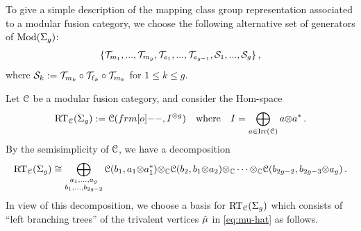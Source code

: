 \documentclass[11pt]{article}
\begin{document}
To give a simple description of the mapping class group representation associated to a modular fusion category, we choose the following alternative set of generators of $\operatorname{Mod}(\Sigma_{g})$:
\begin{equation}\label{eq:mcg-gen}
\{\dt_{m_{1}}, ..., \dt_{m_{g}}, \dt_{e_{1}}, ..., \dt_{e_{g-1}}, \cmcs_{1}, ..., \cmcs_{g}\}\,,
\end{equation}
where $\cmcs_{k} := \dt_{m_{k}} \circ \dt_{\ell_{k}}\circ \dt_{m_{k}}$ for $1 \le k \le g$.

Let $\mathcal{C}$ be a modular fusion category, and consider the Hom-space
\begin{equation}\label{eq:RT-space}
\RTspace{\cC}{g} := \CC(\1, I^{\ot g}) \quad\text{where}\quad
I = \bigoplus_{a \in \irr(\CC)} a \ot a^*\,.
\end{equation}
By the semisimplicity of $\mathcal{C}$, we have a decomposition
\begin{equation}\label{eq:W-decomp}
\operatorname{RT}_{\mathcal{C}}(\Sigma_{g}) \cong 
\bigoplus_{\substack{a_1, ..., a_g\\b_1, ..., b_{2g-2}}}
{\mathcal{C}}(b_1, a_1 {\otimes} a_1^*) {\otimes}_{{\mathbb{C}}} \mathcal{C}(b_2, b_1 {\otimes} a_2) {\otimes}_{{\mathbb{C}}} \cdots {\otimes}_{{\mathbb{C}}} {\mathcal{C}}(b_{2g-2}, b_{2g-3} {\otimes} a_g)\,.
\end{equation}
In view of this decomposition, we choose a basis for $\operatorname{RT}_{\mathcal{C}}(\Sigma_{g})$ which consists of ``left branching trees'' of the trivalent vertices $\hat{\mu}$ in \eqref{eq:mu-hat} as follows. 
\end{document}
